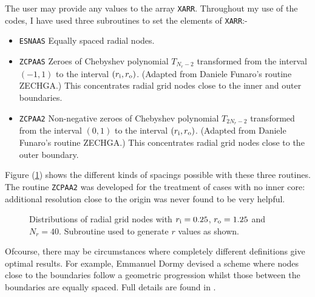 The user may provide any values to the array \verb+XARR+.
Throughout my use of the codes, I have used three
subroutines to set the elements of \verb+XARR+:-
\begin{itemize}
\item \verb.ESNAAS. Equally spaced radial nodes.
\item \verb.ZCPAAS. Zeroes of Chebyshev polynomial $T_{N_r-2}$
                    transformed from the interval $(-1,1)$ to
                    the interval $(r_{\rm i},r_{\rm o})$.
                    (Adapted from Daniele Funaro's routine
                     ZECHGA.) This concentrates radial grid
                     nodes close to the inner and outer
                     boundaries.
\item \verb.ZCPAA2. Non-negative zeroes of Chebyshev
                    polynomial $T_{2N_r-2}$
                    transformed from the interval $( 0,1)$ to
                    the interval $(r_{\rm i},r_{\rm o})$.
                    (Adapted from Daniele Funaro's routine
                     ZECHGA.) This concentrates radial grid
                     nodes close to the outer boundary.
\end{itemize}
Figure (\ref{fig:xarr_versions}) shows the different kinds
of spacings possible with these three routines.
The routine \verb+ZCPAA2+ was developed for the treatment
of cases with no inner core: additional resolution close
to the origin was never found to be very helpful.

\begin{figure}[h]
\centerline{}
\caption[
]
{ \label{fig:xarr_versions} {\footnotesize
Distributions of radial grid nodes with
$r_{\rm i} = 0.25$,
$r_{\rm o} = 1.25$ and $N_r = 40$.
Subroutine used to generate $r$ values as shown.
}}
\end{figure}

Ofcourse, there may be circumstances where completely
different definitions give optimal results.
For example,
Emmanuel Dormy devised a scheme where nodes close
to the boundaries follow a geometric progression whilst
those between the boundaries are equally spaced. Full
details are found in \cite{dormythesis}.


